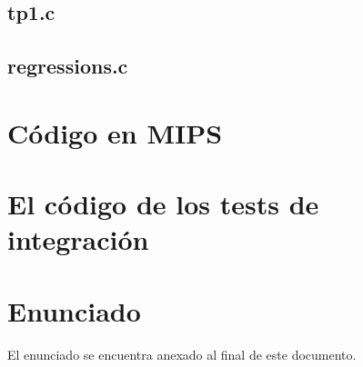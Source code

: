 \documentclass[11pt,a4paper]{article}
\begin{document}
\subsection{tp1.c}

\subsection{regressions.c}


\section{Código en MIPS}


\section{El código de los tests de integración}



\section{Enunciado}
El enunciado se encuentra anexado al final de este documento.
\end{document}
